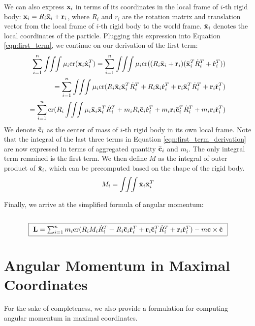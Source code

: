 We can also express $\mathbf{x}_i$ in terms of its coordinates in the
local frame of $i$-th rigid body: $\mathbf{x}_i = R_i \bar{\mathbf{x}}_i +
\mathbf{r}_i$, where $R_i$ and $r_i$ are the rotation matrix and
translation vector from the local frame of $i$-th rigid body to the
world frame. $\bar{\mathbf{x}}_i$ denotes the local coordinates of the
particle. Plugging this expression into Equation \ref{eqn:first_term},
we continue on our derivation of the first term:
\begin{eqnarray}
\sum_{i=1}^n \int \!\! \int \!\! \int \mu_i
\mathrm{cr}(\vc{x}_i \dot{\vc{x}}_i^T) = \sum_{i=1}^n \int \!\! \int \!\! \int \mu_i
\mathrm{cr}((R_i \bar{\vc{x}}_i + \vc{r}_i) (\bar{\vc{x}}_i^T \dot{R}_i^T +
\dot{\vc{r}}_i^T))  \nonumber \\
= \sum_{i=1}^n \int \!\! \int \!\! \int \mu_i \mathrm{cr}( R_i
\bar{\vc{x}}_i \bar{\vc{x}}_i^T \dot{R}_i^T + R_i \bar{\vc{x}}_i
\dot{\vc{r}}_i^T + \vc{r}_i \bar{\vc{x}}_i^T \dot{R}_i^T + \vc{r}_i
\dot{\vc{r}}_i^T) \nonumber \\
= \sum_{i=1}^n \mathrm{cr}(R_i \int\!\!\int\!\!\int \mu_i
\bar{\vc{x}}_i \bar{\vc{x}}_i^T \dot{R}_i^T + m_i R_i \bar{\vc{c}}_i
\dot{\vc{r}}_i^T + m_i \vc{r}_i \bar{\vc{c}}_i^T \dot{R}_i^T + m_i
\vc{r}_i \dot{\vc{r}}_i^T)
\label{eqn:first_term_derivation}
\end{eqnarray}
We denote $\bar{\mathbf{c}}_i$ as the center of mass of $i$-th rigid body
in its own local frame. Note that the integral of the last three terms
in Equation \ref{eqn:first_term_derivation} are now expressed in terms
of aggregated quantity $\bar{\mathbf{c}}_i$ and $m_i$. The only integral
term remained is the first term. We then define $M$
as the integral of outer product of $\bar{\mathbf{x}}_i$, which can be
precomputed based on the shape of the rigid body.
\begin{equation}
M_i = \int \!\! \int \!\! \int \bar{\mathbf{x}}_i \bar{\mathbf{x}}_i^T
\end{equation} 

Finally, we arrive at the simplified formula of angular momentum: \\
\\
\begin{equation}
\framebox{
$\vc{L} = \sum_{i=1}^n m_i \mathrm{cr}(R_i M_i \dot{R}_i^T + R_i \bar{\vc{c}}_i
\dot{\vc{r}}_i^T + \vc{r}_i \bar{\vc{c}}_i^T \dot{R}_i^T + \vc{r}_i
\dot{\vc{r}}_i^T) - m \vc{c} \times \dot{\vc{c}}$
}
\label{eqn:final}
\end{equation}


\section{Angular Momentum in Maximal Coordinates}
For the sake of completeness, we also provide a formulation
for computing angular momentum in maximal coordinates.

